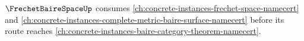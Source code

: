 $\FrechetBaireSpaceUp$ consumes \autoref{ch:concrete-instances-frechet-space-namecert} and \autoref{ch:concrete-instances-complete-metric-baire-surface-namecert} before its route reaches \autoref{ch:concrete-instances-baire-category-theorem-namecert}.


